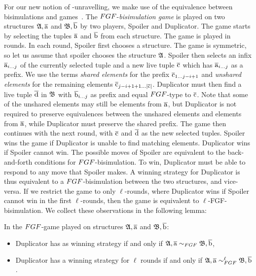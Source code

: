 For our new notion of \FGF-unravelling, we make use of the equivalence between bisimulations and games~\cite[Sec. 1.2.1]{Gradel014}.
The $\FGF$-\emph{bisimulation game} is played on two structures ${\mathfrak{A}}, \overline{\mathrm{a}}$ and ${\mathfrak{B}}, \overline{\mathrm{b}}$ by two players, Spoiler and Duplicator.
The game starts by selecting the tuples $\overline{\mathrm{a}}$ and $\overline{\mathrm{b}}$ from each structure.
The game is played in rounds.
In each round, Spoiler first chooses a structure.
The game is symmetric, so let us assume that spoiler chooses the structure ${\mathfrak{A}}$.
Spoiler then selects an infix $\overline{\mathrm{a}}_{i\ldots j}$ of the currently selected tuple and a new live tuple $\overline{\mathrm{c}}$ which has $\overline{\mathrm{a}}_{i\ldots j}$ as a prefix.
We use the terms \emph{shared elements} for the prefix $\overline{\mathrm{c}}_{1\ldots j-i+1}$ and \emph{unshared elements} for the remaining elements $\overline{\mathrm{c}}_{j-i+1+1\ldots|\overline{\mathrm{c}}|}$.
Duplicator must then find a live tuple $\overline{\mathrm{d}}$ in ${\mathfrak{B}}$ with $\overline{\mathrm{b}}_{i\ldots j}$ as prefix and equal $\FGF$-type to $\overline{\mathrm{c}}$.
Note that some of the unshared elements may still be elements from $\overline{\mathrm{a}}$, but Duplicator is not required to preserve equivalences between the unshared elements and elements from $\overline{\mathrm{a}}$, while Duplicator must preserve the shared prefix.
The game then continues with the next round, with $\overline{\mathrm{c}}$ and $\overline{\mathrm{d}}$ as the new selected tuples.
Spoiler wins the game if Duplicator is unable to find matching elements.
Duplicator wins if Spoiler cannot win.
The possible moves of Spoiler are equivalent to the back-and-forth conditions for $\FGF$-bisimulation.
To win, Duplicator must be able to respond to any move that Spoiler makes.
A winning strategy for Duplicator is thus equivalent to a $\FGF$-bisimulation between the two structures, and vice-versa.
If we restrict the game to only $\ell$-rounds, where Duplicator wins if Spoiler cannot win in the first $\ell$-rounds, then the game is equivalent to $\ell$-FGF-bisimulation.
We collect these observations in the following lemma:
\begin{lemma}
  In the $\FGF$-game played on structures ${\mathfrak{A}}, \overline{\mathrm{a}}$ and ${\mathfrak{B}}, \overline{\mathrm{b}}$:
  \begin{itemize}
    \item Duplicator has as winning strategy if and only if $\str{A}, \elemtuplea \bisimto_{\FGF} \str{B}, \elemtupleb$,
    \item Duplicator has a winning strategy for $\ell$ rounds if and only if $\str{A}, \elemtuplea \bisimto_{\FGF}^{\ell} \str{B}, \elemtupleb$.
  \end{itemize}
\end{lemma}

